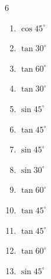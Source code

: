 \begin{multicols}{6}
\begin{enumerate}
  \item $\displaystyle \cos{45^\circ}$


  \item $\displaystyle \tan{30^\circ}$


  \item $\displaystyle \tan{60^\circ}$


\columnbreak %

  \item $\displaystyle \tan{30^\circ}$


  \item $\displaystyle \sin{45^\circ}$


  \item $\displaystyle \tan{45^\circ}$

        \phantom{$\displaystyle =1$}

  \item $\displaystyle \sin{45^\circ}$


  \item $\displaystyle \sin{30^\circ}$


  \item $\displaystyle \tan{60^\circ}$


  \item $\displaystyle \tan{45^\circ}$

        \phantom{$\displaystyle =1$}

  \item $\displaystyle \tan{45^\circ}$

        \phantom{$\displaystyle =1$}

  \item $\displaystyle \tan{60^\circ}$


  \item $\displaystyle \sin{45^\circ}$


\end{enumerate}
\end{multicols}
